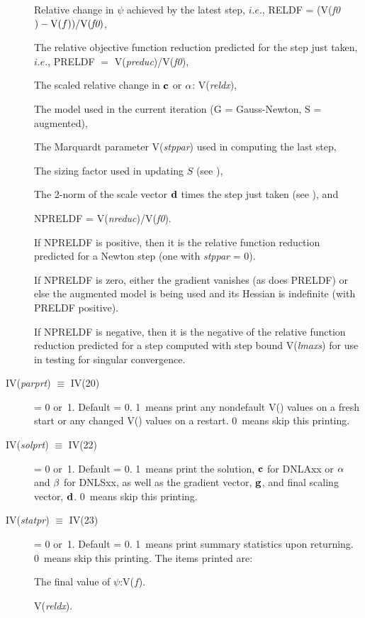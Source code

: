 \documentclass[twoside]{MATH77}
\begin{document}
\begin{description}
Relative change in $\psi $ achieved by the latest step, $i.e.$, RELDF =
(V({\em f0}$) - \text{V}(f))/\text{V({\em f0})}$,

The relative objective function reduction predicted for the step just taken,
$i.e.$, PRELDF $=$ V({\em preduc})/V({\em f0}),

The scaled relative change in ${\bf c}$ or ${\bf \alpha }$: V({\em reldx}),

The model used in the current iteration (G = Gauss-Newton, S = augmented),

The Marquardt parameter V({\em stppar}) used in computing the last step,

The sizing factor used in updating $S$ (see \cite{Dennis:1981:ANL}),

The 2-norm of the scale vector ${\bf d}$ times the step just taken (see
\cite{Dennis:1981:ANL}), and

NPRELDF = V({\em nreduc})/V({\em f0}).

If NPRELDF is positive, then it is the relative function reduction predicted
for a Newton step (one with {\em stppar} = 0).

If NPRELDF is zero, either the gradient vanishes (as does PRELDF) or else
the augmented model is being used and its Hessian is indefinite (with PRELDF
positive).

If NPRELDF is negative, then it is the negative of the relative function
reduction predicted for a step computed with step bound V({\em lmaxs}) for use in
testing for singular convergence.

\item[IV({\em parprt}) $\equiv $ IV(20)]  = 0 or~1. Default = 0. 1~means print any
nondefault V() values on a fresh start or any changed V() values on a
restart. 0~means skip this printing.

\item[IV({\em solprt}) $\equiv $ IV(22)]  = 0 or~1. Default = 0. 1~means print
the solution, ${\bf c}$ for DNLAxx or ${\bf \alpha }$ and ${\bf \beta }$ for
DNLSxx, as well as the gradient vector, ${\bf g}$, and final scaling vector,
${\bf d}$. 0~means skip this printing.

\item[IV({\em statpr}) $\equiv $ IV(23)]  = 0 or~1. Default = 0. 1~means print
summary statistics upon returning. 0~means skip this printing. The items
printed are:

The final value of $\psi $:V($f$).

V({\em reldx}).


\end{description}
\end{document}
